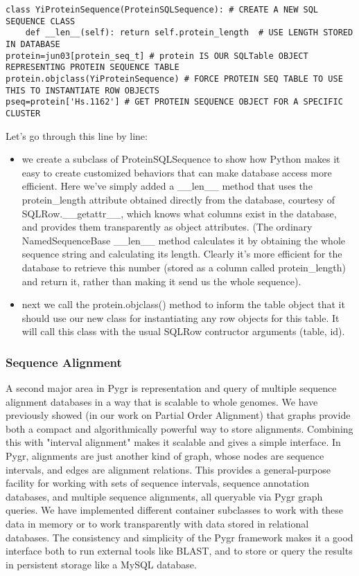 \documentclass{howto}
\begin{document}
\begin{verbatim}
class YiProteinSequence(ProteinSQLSequence): # CREATE A NEW SQL SEQUENCE CLASS
    def __len__(self): return self.protein_length  # USE LENGTH STORED IN DATABASE
protein=jun03[protein_seq_t] # protein IS OUR SQLTable OBJECT REPRESENTING PROTEIN SEQUENCE TABLE
protein.objclass(YiProteinSequence) # FORCE PROTEIN SEQ TABLE TO USE THIS TO INSTANTIATE ROW OBJECTS
pseq=protein['Hs.1162'] # GET PROTEIN SEQUENCE OBJECT FOR A SPECIFIC CLUSTER
\end{verbatim}

Let's go through this line by line:

\begin{itemize}

\item
we create a subclass of ProteinSQLSequence to show how Python makes it easy to create customized behaviors that can make database access more efficient.  Here we've simply added a __len__ method that uses the protein_length attribute obtained directly from the database, courtesy of SQLRow.__getattr__, which knows what columns exist in the database, and provides them transparently as object attributes.  (The ordinary NamedSequenceBase __len__ method calculates it by obtaining the whole sequence string and calculating its length.  Clearly it's more efficient for the database to retrieve this number (stored as a column called protein_length) and return it, rather than making it send us the whole sequence).

\item
next we call the protein.objclass() method to inform the table object that it should use our new class for instantiating any row objects for this table.  It will call this class with the usual SQLRow contructor arguments (table, id).
\end{itemize}

\subsubsection{Sequence Alignment}

A second major area in Pygr is representation and query of multiple sequence alignment databases in a way that is scalable to whole genomes.  We have previously showed (in our work on Partial Order Alignment) that graphs provide both a compact and algorithmically powerful way to store alignments.  Combining this with "interval alignment" makes it scalable and gives a simple interface.  In Pygr, alignments are just another kind of graph, whose nodes are sequence intervals, and edges are alignment relations.  This provides a general-purpose facility for working with sets of sequence intervals, sequence annotation databases, and multiple sequence alignments, all queryable via Pygr graph queries.  We have implemented different container subclasses to work with these data in memory or to work transparently with data stored in relational databases.  The consistency and simplicity of the Pygr framework makes it a good interface both to run external tools like BLAST, and to store or query the results in persistent storage like a MySQL database.
\end{document}
